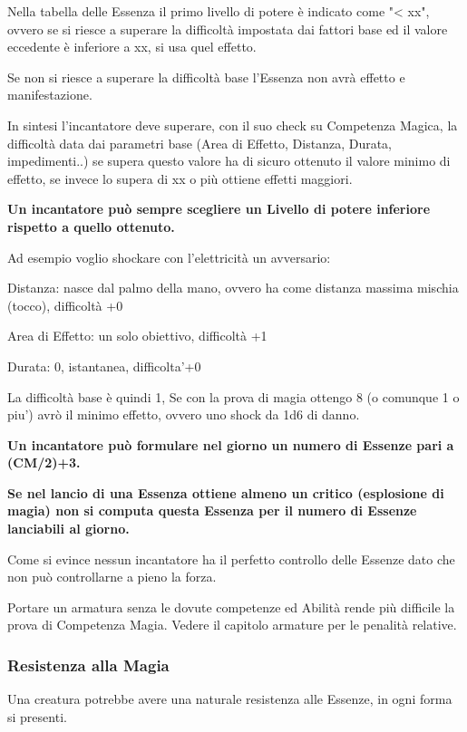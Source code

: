 \documentclass[a4paper,11pt,twoside,openany]{book}
\begin{document}
Nella tabella delle Essenza il primo livello di potere è indicato come "< xx", ovvero se si riesce a superare la difficoltà impostata dai fattori base ed il valore eccedente è inferiore a xx, si usa quel effetto.

Se non si riesce a superare la difficoltà base l'Essenza non avrà effetto e manifestazione.

In sintesi l'incantatore deve superare, con il suo check su Competenza Magica, la difficoltà data dai parametri base (Area di Effetto, Distanza, Durata, impedimenti..) se supera questo valore ha di sicuro ottenuto il valore minimo di effetto, se invece lo supera di xx o più ottiene effetti maggiori.

\bigskip

 \textbf{Un incantatore può sempre scegliere un Livello di potere
inferiore rispetto a quello ottenuto.}

Ad esempio voglio shockare con l'elettricità un avversario:

Distanza: nasce dal palmo della mano, ovvero ha come distanza massima mischia (tocco), difficoltà +0

Area di Effetto: un solo obiettivo, difficoltà +1

Durata: 0, istantanea, difficolta'+0

La difficoltà base è quindi 1, Se con la prova di magia ottengo 8 (o comunque 1 o piu') avrò il minimo effetto, ovvero uno shock da 1d6 di danno.

\bigskip

\textbf{Un incantatore può formulare nel giorno un numero di Essenze pari a (CM/2)+3.}

\textbf{Se nel lancio di una Essenza ottiene almeno un critico (esplosione di magia) non si computa questa Essenza per il numero di Essenze lanciabili al giorno.}

Come si evince nessun incantatore ha il perfetto controllo delle Essenze dato che non può controllarne a pieno la forza.

Portare un armatura senza le dovute competenze ed Abilità rende più difficile la prova di Competenza Magia. Vedere il capitolo armature per le penalità relative.

\subsubsection{Resistenza alla Magia}

Una creatura potrebbe avere una naturale resistenza alle Essenze, in ogni forma si presenti.
\end{document}
